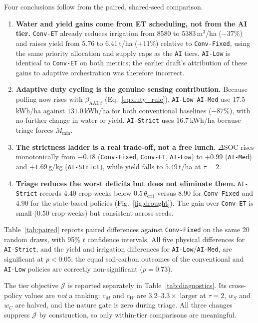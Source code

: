 \documentclass[11pt,a4paper]{article}
\newcommand{\AAI}{\mathrm{AAI}}
\begin{document}
Four conclusions follow from the paired, shared-seed comparison.

\begin{enumerate}
  \item \textbf{Water and yield gains come from ET scheduling, not from the AI tier.} \texttt{Conv-ET} already reduces irrigation from $8580$ to $5383$\,m$^3$/ha ($-37\%$) and raises yield from $5.76$ to $6.41$\,t/ha ($+11\%$) relative to \texttt{Conv-Fixed}, using the same priority allocation and supply caps as the \texttt{AI} tiers. \texttt{AI-Low} is identical to \texttt{Conv-ET} on both metrics; the earlier draft's attribution of these gains to adaptive orchestration was therefore incorrect.
  \item \textbf{Adaptive duty cycling is the genuine sensing contribution.} Because polling now rises with $\beta_{\AAI,t}$ (Eq.~\eqref{eq:duty_rule}), \texttt{AI-Low}--\texttt{AI-Med} use $17.5$\,kWh/ha against $131.0$\,kWh/ha for both conventional baselines ($-87\%$), with no further change in water or yield. \texttt{AI-Strict} uses $16.7$\,kWh/ha because triage forces $M_{\min}$.
  \item \textbf{The strictness ladder is a real trade-off, not a free lunch.} $\Delta$SOC rises monotonically from $-0.18$ (\texttt{Conv-Fixed}, \texttt{Conv-ET}, \texttt{AI-Low}) to $+0.99$ (\texttt{AI-Med}) and $+1.69$\,g/kg (\texttt{AI-Strict}), while yield falls to $5.49$\,t/ha at $\tau=2$.
  \item \textbf{Triage reduces the worst deficits but does not eliminate them.} \texttt{AI-Strict} records $4.40$ crop-weeks below $0.5\,\theta_{\mathrm{crit}}$ versus $8.90$ for \texttt{Conv-Fixed} and $4.90$ for the state-based policies (Fig.~\ref{fig:drought}). The gain over \texttt{Conv-ET} is small ($0.50$ crop-weeks) but consistent across seeds.
\end{enumerate}

Table~\ref{tab:paired} reports paired differences against \texttt{Conv-Fixed} on the same 20 random draws, with 95\% $t$ confidence intervals. All five physical differences for \texttt{AI-Strict}, and the yield and irrigation differences for \texttt{AI-Low}/\texttt{AI-Med}, are significant at $p<0.05$; the equal soil-carbon outcomes of the conventional and \texttt{AI-Low} policies are correctly non-significant ($p=0.73$).



The tier objective $\mathcal{J}$ is reported separately in Table~\ref{tab:diagnostics}. Its cross-policy values are \emph{not} a ranking: $c_M$ and $c_W$ are $3.2$--$3.3\times$ larger at $\tau=2$, $w_S$ and $w_C$ are halved, and the nature gate is zero during triage. All three changes suppress $\mathcal{J}$ by construction, so only within-tier comparisons are meaningful.
\end{document}
